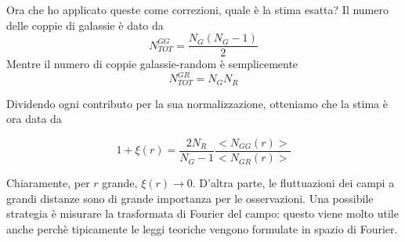 \documentclass{report}
\begin{document}
{    Ora che ho applicato queste come correzioni, quale è la stima esatta? Il numero delle coppie di galassie è dato da 
    \begin{equation}
        N^{GG}_{TOT} = \frac{N_G(N_G -1)}{2}
    \end{equation}
    Mentre il numero di coppie galassie-random è semplicemente
    \begin{equation}
        N^{GR}_{TOT} = N_GN_R
    \end{equation}
        
    Dividendo ogni contributo per la sua normalizzazione, otteniamo che la stima è ora data da 
    \begin{tcolorbox}[colback=gray!15, colframe=black, boxrule=1pt]
    \begin{equation}
        \label{Peebles_davis}
        1 + \xi (r) = \frac{2N_R}{N_G -1}\frac{<N_{GG}(r)>}{<N_{GR}(r)>} 
    \end{equation}
    \end{tcolorbox}
}

Chiaramente, per $r$ grande, $\xi(r) \rightarrow 0$. D'altra parte, le fluttuazioni dei campi a grandi distanze sono di grande importanza per le osservazioni. Una possibile strategia è misurare la trasformata di Fourier del campo: questo viene molto utile anche perchè tipicamente le leggi teoriche vengono formulate in spazio di Fourier. 

\newpage
\end{document}

